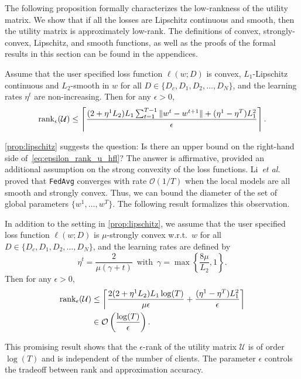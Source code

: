 The following proposition formally characterizes the low-rankness of the utility matrix. We show that if all the losses are Lipschitz continuous and smooth, then the utility matrix is approximately low-rank. The definitions of convex, strongly-convex, Lipschitz, and smooth functions, as well as the proofs of the formal results in this section can be found in the appendices.

\begin{proposition} \label{prop:lipschitz}
    Assume that the user specified loss function $\ell(w; D)$ is convex, $L_1$-Lipschitz continuous and $L_2$-smooth in $w$ for all $D \in \{D_c, D_1, D_2, \dots, D_N\}$, and the learning rates $\eta^t$ are non-increasing. 
    Then for any $\epsilon>0$, 
    \begin{equation} \label{eq:epsilon_rank_u_hfl}
        \operatorname{rank}_{\epsilon}(\mathcal{U}) \leq \left\lceil \frac{(2+\eta^1L_2) L_1 \sum_{t=1}^{T-1} \|w^{t} - w^{t+1}\| + (\eta^1 - \eta^T) L_1^2}{\epsilon} \right\rceil.
    \end{equation} 
\end{proposition}

\autoref{prop:lipschitz} suggests the question: Is there an upper bound on the right-hand side of~\eqref{eq:epsilon_rank_u_hfl}? The answer is affirmative, provided an additional assumption on the strong convexity of the loss functions. Li~\textit{et al.}~\cite{li2019convergence} proved that \texttt{FedAvg} converges with rate $\mathcal{O}(1 / T)$ when the local models are all smooth and strongly convex. Thus, we can bound the diameter of the set of global parameters $\{w^1, \dots, w^T\}$. The following result formalizes this observation. 

\begin{proposition} \label{prop:strongly_cvx}
    In addition to the setting in \autoref{prop:lipschitz}, we assume that the user specified loss function $\ell(w; D)$ is $\mu$-strongly convex w.r.t.\ $w$ for all $D \in \{D_c, D_1, D_2, \dots, D_N\}$, and the learning rates are defined by 
    \[\eta^t = \frac{2}{\mu(\gamma + t)} \enspace\text{with}\enspace \gamma = \max\left\{\frac{8\mu}{L_2}, 1\right\}.\]
    Then for any $\epsilon>0$, 
    \begin{align*}
        \operatorname{rank}_{\epsilon}(\mathcal{U}) &\leq \left\lceil \frac{2(2+\eta^1L_2) L_1 \log(T)}{\mu\epsilon} +  \frac{(\eta^1 - \eta^T)L_1^2}{\epsilon} \right\rceil
        \\&\in \mathcal{O}\left(\frac{\log(T)}{\epsilon}\right).
    \end{align*}
\end{proposition}
This promising result shows that the $\epsilon$-rank of the utility matrix $\mathcal{U}$ is of order $\log(T)$ and is independent of the number of clients. The parameter $\epsilon$ controls the tradeoff between rank and approximation accuracy.

